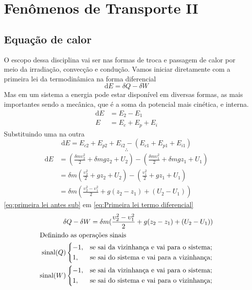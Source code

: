 \chapter{Fenômenos de Transporte II}
\section{Equação de calor}
O escopo dessa disciplina vai ser nas formas de troca e passagem de calor por meio da irradiação,
convecção e condução. Vamos iniciar diretamente com a primeira lei da termodinâmica na forma
diferencial
\begin{equation}\label{eq:Primeira lei termo diferencial}
    \mathrm{d}E=\delta Q-\delta W
\end{equation}
Mas em um sistema a energia pode estar disponível em diversas formas, as mais importantes sendo a
mecânica, que é a soma da potencial mais cinética, e interna.
\begin{align}
    \mathrm{d}E&=E_2-E_1\\
    E&=E_c + E_p + E_i 
\end{align}
Substituindo uma na outra
\begin{equation}
    \mathrm{d}E=E_{c2}  + E_{p2}  + E_{i2}- (E_{c1}  + E_{p1}  + E_{i1} )   
\end{equation}
\[
    \therefore
\]
\begin{align}
    \mathrm{d} E&=(\frac{\delta m \upsilon ^{2}_2 }{2}+ \delta mgz_2 +U_2)-(\frac{\delta m \upsilon ^{2}_1 }{2}+ \delta mgz_1 +U_1)\\
    &=\delta m(\frac{ \upsilon ^{2}_2 }{2}+ gz_2 +U_2)-(\frac{ \upsilon ^{2}_1 }{2}+ gz_1 +U_1)\\
    \label{eq:primeira lei antes sub}
    &=\delta m(\frac{ \upsilon ^{2}_2-\upsilon ^{2}_1 }{2}+ g(z_{2}-z_1)  +(U_2-U_1))
\end{align}
\eqref{eq:primeira lei antes sub} em \eqref{eq:Primeira lei termo diferencial}
\begin{align}\label{eq:primeira lei pt 3}
    \delta Q - \delta W =\delta m(\frac{ \upsilon ^{2}_2-\upsilon ^{2}_1 }{2}+ g(z_{2}-z_1)  +(U_2-U_1))\\
    \intertext{Definindo as operações sinais}\notag 
    \text{sinal}(Q)
    \begin{dcases}
        -1, & \text{se sai da vizinhança e vai para o sistema} ;\\
        1, & \text{se sai do sistema e vai para a vizinhança};\\
    \end{dcases}\notag \\
    \text{sinal}(W)
    \begin{dcases}
        -1, & \text{se sai da vizinhança e vai para o sistema} ;\\
        1, & \text{se sai do sistema e vai para o vizinhança};\\
    \end{dcases}\notag 
\end{align}
